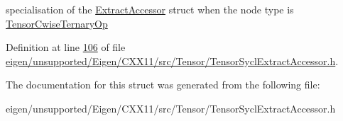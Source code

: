 specialisation of the \hyperlink{struct_eigen_1_1_tensor_sycl_1_1internal_1_1_extract_accessor}{Extract\+Accessor} struct when the node type is \hyperlink{class_eigen_1_1_tensor_cwise_ternary_op}{Tensor\+Cwise\+Ternary\+Op} 

Definition at line \hyperlink{eigen_2unsupported_2_eigen_2_c_x_x11_2src_2_tensor_2_tensor_sycl_extract_accessor_8h_source_l00106}{106} of file \hyperlink{eigen_2unsupported_2_eigen_2_c_x_x11_2src_2_tensor_2_tensor_sycl_extract_accessor_8h_source}{eigen/unsupported/\+Eigen/\+C\+X\+X11/src/\+Tensor/\+Tensor\+Sycl\+Extract\+Accessor.\+h}.



The documentation for this struct was generated from the following file\+:\begin{DoxyCompactItemize}
\item 
eigen/unsupported/\+Eigen/\+C\+X\+X11/src/\+Tensor/\+Tensor\+Sycl\+Extract\+Accessor.\+h\end{DoxyCompactItemize}
